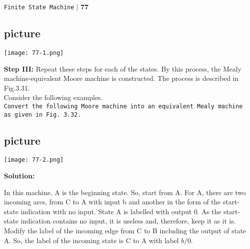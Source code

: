 \documentclass{article}
\begin{document}
\begin{flushright}
 \texttt{Finite State Machine} \hspace*{0.10cm}\textbf{$|$} \textbf{77}\hspace*{0.5cm}
\end{flushright}

\vspace*{1cm}
\begin{center}
\section{picture}
\texttt{[image: 77-1.png]}
\end{center}

\vspace*{0.5cm}
\textbf{Step III:} Repeat these steps for each of the states. By this process, the Mealy machine-equivalent Moore
machine is constructed. The process is described in Fig.3.31.\\
\hspace*{0.2cm} Consider the following examples.\\

\hspace*{0.1cm} \texttt{\small{Convert the following Moore machine into an equivalent Mealy machine as given in Fig. 3.32.}}
\begin{center}
\section{picture}
\texttt{[image: 77-2.png]}
\end{center}

\textbf{Solution:}

\small{In this machine, A is the beginning state. So, start from
A. For A, there are two incoming arcs, from C to A
with input b and another in the form of the start-state
indication with no input. State A is labelled with output
$0$. As the start-state indication contains no input, it is
useless and, therefore, keep it as it is.\\
\hspace*{0.2cm} Modify the label of the incoming edge from C to
B including the output of state A. So, the label of the
incoming state is C to A with label $b/0$.}
\end{document}
